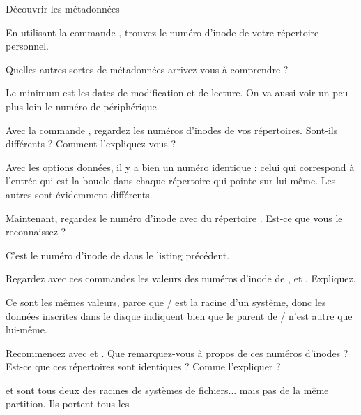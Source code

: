 

\begin{exercice}
  \begin{exercicelet}{Découvrir les métadonnées}
    \begin{questions}
    \item En utilisant la commande , trouvez le numéro
      d'inode de votre répertoire personnel.
    \item Quelles autres sortes de métadonnées arrivez-vous à comprendre ?
      \begin{correction}
        Le minimum est les dates de modification et de lecture. On va
        aussi voir un peu plus loin le numéro de périphérique.
      \end{correction}
    \item Avec la commande , regardez les numéros
      d'inodes de vos répertoires. Sont-ils différents ? Comment
      l'expliquez-vous ?
      \begin{correction}
        Avec les options données, il y a bien un numéro identique :
        celui qui correspond à l'entrée  qui est la boucle dans
        chaque répertoire qui pointe sur lui-même. Les autres sont
        évidemment différents.
      \end{correction}
    \item Maintenant, regardez le numéro d'inode avec  du
      répertoire . Est-ce que vous le reconnaissez ?
      \begin{correction}
        C'est le numéro d'inode de  dans le listing précédent.
      \end{correction}
    \item Regardez avec ces commandes les valeurs des numéros d'inode de
      \lin{/},  et . Expliquez.
      \begin{correction}
        Ce sont les mêmes valeurs, parce que / est la racine d'un
        système, donc les données inscrites dans le disque indiquent
        bien que le parent de / n'est autre que lui-même.
      \end{correction}
    \item Recommencez avec  et . Que
      remarquez-vous à propos de ces numéros d'inodes ? Est-ce que ces
      répertoires sont identiques ? Comme l'expliquer ?
      \begin{correction}
         et \lin{/} sont tous deux des racines de systèmes de
        fichiers... mais pas de la même partition. Ils portent tous les

\end{correction}
\end{questions}
\end{exercicelet}
\end{exercice}
